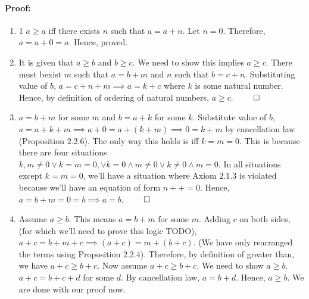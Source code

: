 \documentclass{report}
\begin{document}
\paragraph{Proof: }
\begin{enumerate}
	\item 1
		$a \ge a$ iff there exists  $n$ such that $a = a + n$. Let $n=0$. Therefore, $a= a + 0 = a$. Hence, proved.
	\item
		It is given that  $a \ge b$ and $b \ge c$. We need to show this implies $a \ge c$. There must bexist $m$ such that  $a = b + m$ and  $n$ such that $b = c + n$. Substituting value of $b$, $a = c + n + m \implies a = k + c$ where  $k$ is some natural number. Hence, by definition of ordering of natural numbers, $a \ge c$.  $\qed$   
	\item
		 $a = b + m$ for some  $m$ and $b = a + k$ for some $k$. Substitute value of $b$, $a = a + k + m \implies a + 0 = a + (k+m) \implies 0 = k +m $ by cancellation law (Proposition $2.2.6$). The only way this holds is iff $k = m = 0$.
	This is because there are four situations $k,m \ne 0 \lor k=m=0, \lor k = 0 \land m \ne 0 \lor k \ne 0 \land m=0$. In all situations except $k=m=0$, we'll have a situation where  Axiom  $2.1.3$ is violated because we'll have an equation of form  $n++=0$. Hence, $a = b + m = 0 = b \implies a = b$. $\qed$ 
	\item 
	Assume $a \ge b$. This means $a = b + m$ for some $m$. Adding $c$ on both sides,   (for which we'll need to prove this logic TODO), $a + c = b + m + c \implies \left( a +c \right) = m + (b+c)$. (We have only rearranged the terms using Proposition $2.2.4$). Therefore, by definition of greater than, we have  $a + c \ge b+c$.
	Now assume  $a +c \ge b + c $. We need to show  $a \ge b$.  $a +c= b +c + d$ for some  $d$. 
By cancellation law, $a = b + d$. Hence, $a \ge b$.  We are done with our proof now.

\end{enumerate}
\end{document}
